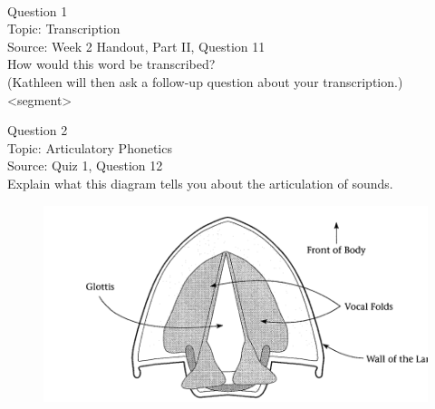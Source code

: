 \documentclass[12pt]{article}
\begin{document}
\newpage

\begin{center}
\textbf{{\color{red}{\HUGE END OF EXAM}}}\\

\end{center}
\newpage

\begin{center}
\textbf{{\color{blue}{\HUGE START OF EXAM\\}}}

\textbf{{\color{blue}{\HUGE Student ID: 78680\\}}}

\textbf{{\color{blue}{\HUGE \\}}}

\end{center}
\newpage

{\large Question 1}\\

Topic: Transcription\\
Source: Week 2 Handout, Part II, Question 11\\

How would this word be transcribed?\\ (Kathleen will then ask a follow-up question about your transcription.)\\

<segment>


\newpage

{\large Question 2}\\

Topic: Articulatory Phonetics\\
Source: Quiz 1, Question 12\\

Explain what this diagram tells you about the articulation of sounds.\\

\begin{figure}[H]
\includegraphics{../images/spreadglottis_diagram.png}
\end{figure}
\end{document}
